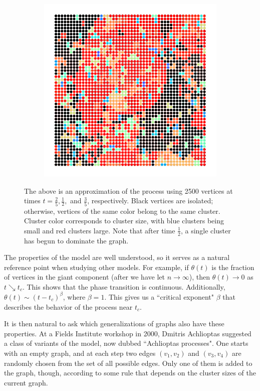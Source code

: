 \documentclass[twoside,10pt]{article}
\begin{document}
\begin{figure}[H]
\begin{subfigure}
	\end{subfigure}
	\begin{subfigure}
		\centering
                \includegraphics[scale=0.45]{fig/postcrit.pdf}
        \end{subfigure}
	\caption{The above is an approximation of the \ER process using 2500 vertices at times $t = \frac{2}{5} ,\frac{1}{2} ,$ and $\frac{3}{5} $, respectively. Black vertices are isolated; otherwise, vertices of the same color belong to the same cluster. Cluster color corresponds to cluster size, with blue clusters being small and red clusters large. Note that after time $\frac{1}{2} $, a single cluster has begun to dominate the graph.}
\end{figure}

The properties of the \ER model are well understood, so it serves as a natural reference point when studying other models. For example, if $\theta(t)$ is the fraction of vertices in the giant component (after we have let $n\to \infty$), then $\theta(t)\to 0$ as $t\searrow t_{c}$. This shows that the phase transition is continuous. Additionally, $\theta(t) \sim (t-t_{c})^{\beta}$, where $\beta=1$. This gives us a ``critical exponent" $\beta$ that describes the behavior of the process near $t_{c}$.

It is then natural to ask which generalizations of \ER graphs also have these properties. At a Fields Institute workshop in 2000, Dmitris Achlioptas suggested a class of variants of the \ER model, now dubbed ``Achlioptas processes". One starts with an empty graph, and at each step two edges $(v_1,v_2)$ and $(v_3,v_4)$ are randomly chosen from the set of all possible edges. Only one of them is added to the graph, though, according to some rule that depends on the cluster sizes of the current graph.
\end{document}
